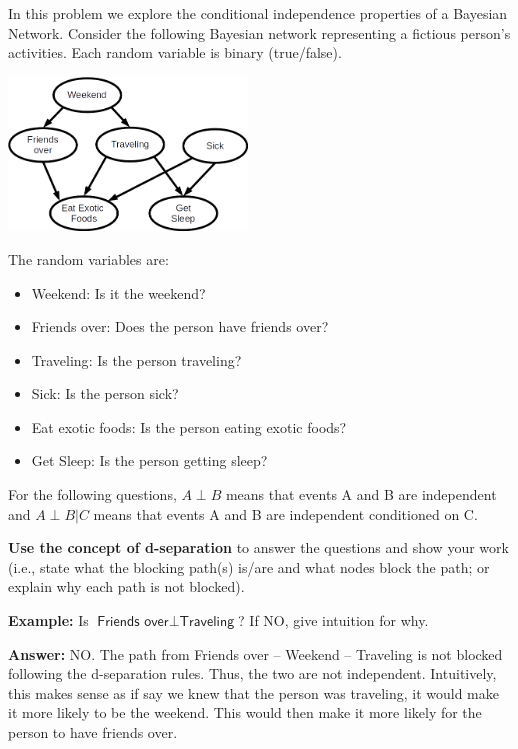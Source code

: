 \documentclass[submit]{harvardml}
\newcommand{\attr}[1]{\textsf{#1}}
\begin{document}
\newpage

\begin{problem}

  \noindent In this problem we explore the conditional independence
  properties of a Bayesian Network.  Consider the following Bayesian
  network representing a fictious person's activities. Each random
  variable is binary (true/false).

\begin{center}
\includegraphics[width=2.5in]{bn.png}
\end{center}

The random variables are:

\begin{itemize}
\item \attr{Weekend}: Is it the weekend?
\item \attr{Friends over}: Does the person have friends over?
\item \attr{Traveling}: Is the person traveling?
\item \attr{Sick}: Is the person sick?
\item \attr{Eat exotic foods}: Is the person eating exotic foods?
\item \attr{Get Sleep}: Is the person getting sleep?
\end{itemize}

\medskip

For the following questions, $A \perp B$ means that events A and B are
independent and $A \perp B | C$ means that events A and B are independent
conditioned on C.

\textbf{Use the concept of d-separation} to answer the
questions and show your work (i.e., state what the blocking path(s) is/are and what nodes block the path; or explain why each path is not blocked).

\textbf{Example:} Is $\attr{Friends over} \perp \attr{Traveling}$? If NO, give intuition for why.

\textbf{Answer:} NO. The path from Friends over -- Weekend -- Traveling is not blocked following the d-separation rules. Thus, the two are not independent. Intuitively, this makes sense as if say we knew that the person was traveling, it would make it more likely to be the weekend. This would then make it more likely for the person to have friends over. 


\end{problem}
\end{document}
